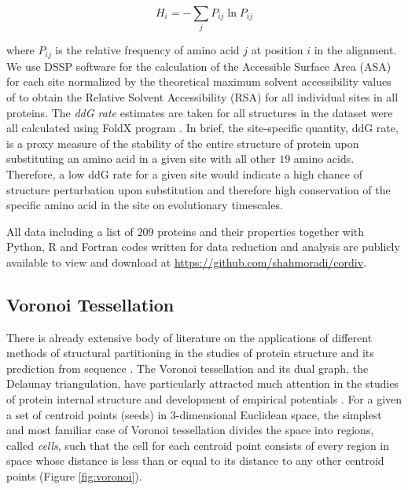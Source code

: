 \documentclass[11pt]{article}
\begin{document}
        \begin{equation}
            \label{eqn:shannon}
            H_i = -\sum_j P_{ij}\ln P_{ij}
        \end{equation}

        where $P_{ij}$ is the relative frequency of amino acid $j$ at position $i$ in the alignment. We use DSSP software \citep[][]{Kabsch1983} for the calculation of the Accessible Surface Area (ASA) for each site normalized by the theoretical maximum solvent accessibility values of \citet{Tien2013} to obtain the Relative Solvent Accessibility (RSA) for all individual sites in all proteins. The {\it ddG rate} estimates are taken for all structures in the dataset were all calculated using FoldX program \citep[c.f.,][ for details of the methodology employed]{Echave2014}. In brief, the site-specific quantity, ddG rate, is a proxy measure of the stability of the entire structure of protein upon substituting an amino acid in a given site with all other $19$ amino acids. Therefore, a low ddG rate for a given site would indicate a high chance of structure perturbation upon substitution and therefore high conservation of the specific amino acid in the site on evolutionary timescales. 
		 
        All data including a list of $209$ proteins and their properties together with Python, R and Fortran codes written for data reduction and analysis are publicly available to view and download at \url{https://github.com/shahmoradi/cordiv}.

    \subsection*{Voronoi Tessellation}

        There is already extensive body of literature on the applications of different methods of structural partitioning in the studies of protein structure and its prediction from sequence \citep[e.g., ][]{Richards 1974, Gerstein 1994}. The Voronoi tessellation and its dual graph, the Delaunay triangulation, have particularly attracted much attention in the studies of protein internal structure and development of empirical potentials \citep[e.g., ][]{Zomorodian2006, Zhou2014, Zia2014}. For a given a set of centroid points (seeds) in 3-dimensional Euclidean space, the simplest and most familiar case of Voronoi tessellation divides the space into regions, called {\it cells}, such that the cell for each centroid point consists of every region in space whose distance is less than or equal to its distance to any other centroid points (Figure \ref{fig:voronoi}). \\
\end{document}
